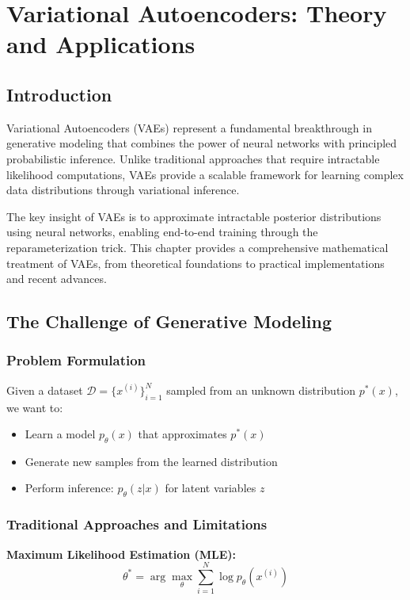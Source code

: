 \chapter{Variational Autoencoders: Theory and Applications}

\section{Introduction}

Variational Autoencoders (VAEs) represent a fundamental breakthrough in generative modeling that combines the power of neural networks with principled probabilistic inference. Unlike traditional approaches that require intractable likelihood computations, VAEs provide a scalable framework for learning complex data distributions through variational inference.

The key insight of VAEs is to approximate intractable posterior distributions using neural networks, enabling end-to-end training through the reparameterization trick. This chapter provides a comprehensive mathematical treatment of VAEs, from theoretical foundations to practical implementations and recent advances.

\section{The Challenge of Generative Modeling}

\subsection{Problem Formulation}

Given a dataset $\mathcal{D} = \{x^{(i)}\}_{i=1}^N$ sampled from an unknown distribution $p^*(x)$, we want to:
\begin{itemize}
    \item Learn a model $p_\theta(x)$ that approximates $p^*(x)$
    \item Generate new samples from the learned distribution
    \item Perform inference: $p_\theta(z|x)$ for latent variables $z$
\end{itemize}

\subsection{Traditional Approaches and Limitations}

\textbf{Maximum Likelihood Estimation (MLE):}
\begin{equation}
    \theta^* = \arg\max_\theta \sum_{i=1}^N \log p_\theta(x^{(i)})
\end{equation}


